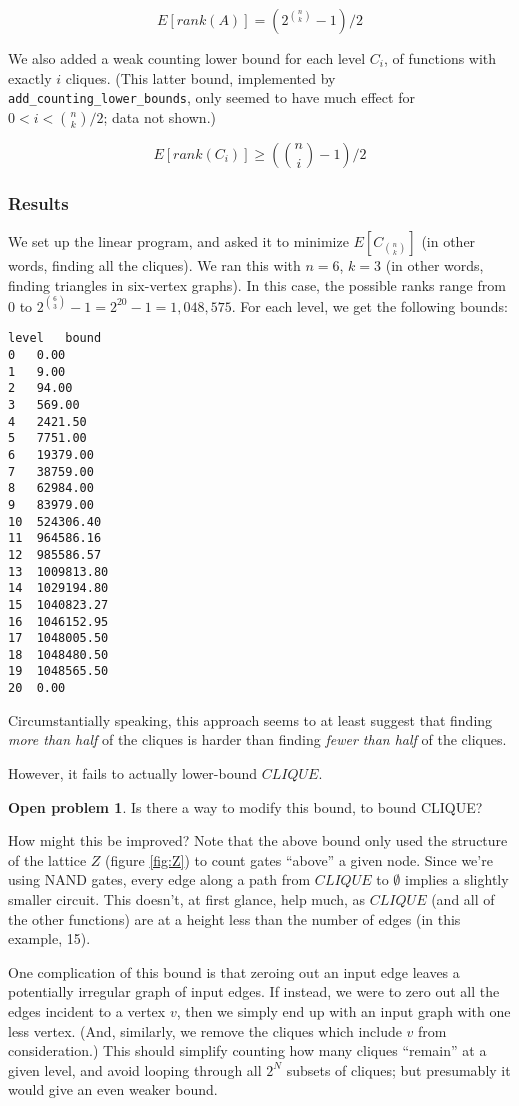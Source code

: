 \documentclass[12pt]{article}
\theoremstyle{definition}
\newtheorem{prob}{Open problem}[section]
\begin{document}
\[
E[rank(A)] = (2^{n \choose k} - 1) / 2
\]

We also added a weak counting lower bound for each level $C_i$, of functions
with exactly $i$ cliques. (This latter bound, implemented by
{\tt add\_counting\_lower\_bounds}, only seemed to have much
effect for $0 < i < {n \choose k}/2$; data not shown.)

\[
E[rank(C_i)] \ge ({n \choose i} - 1) / 2
\]

\subsubsection{Results}

We set up the linear program, and asked it to minimize $E[C_{n \choose k}]$
(in other words, finding all the cliques). We ran this with $n=6$, $k=3$
(in other words, finding triangles in six-vertex graphs). In this case,
the possible ranks range from $0$ to $2^{6 \choose 3}-1 = 2^{20}-1 = 1,048,575$.
For each level, we get the following bounds:

\begin{verbatim}
level	bound
0	0.00
1	9.00
2	94.00
3	569.00
4	2421.50
5	7751.00
6	19379.00
7	38759.00
8	62984.00
9	83979.00
10	524306.40
11	964586.16
12	985586.57
13	1009813.80
14	1029194.80
15	1040823.27
16	1046152.95
17	1048005.50
18	1048480.50
19	1048565.50
20	0.00
\end{verbatim}

Circumstantially speaking, this approach seems to at least suggest
that finding {\em more than half} of the cliques is harder than finding
{\em fewer than half} of the cliques.

However, it fails to actually lower-bound $CLIQUE$.

\begin{prob}
\label{lpRepair}
Is there a way to modify this bound, to bound CLIQUE?
\end{prob}

How might this be improved?
Note that the above bound only used the structure of the lattice $Z$ 
(figure \ref{fig:Z}) to count gates ``above'' a given node.
Since we're using NAND gates, every edge along a path from $CLIQUE$ to $\emptyset$
implies a slightly smaller circuit. This doesn't, at first glance, help much, as
$CLIQUE$ (and all of the other functions) are at a height less than the number of edges
(in this example, 15).

One complication of this bound is that zeroing out an input edge leaves a potentially
irregular graph of input edges. If instead, we were to zero out all the edges incident to a
vertex $v$, then we simply end up with an input graph with one less vertex.
(And, similarly, we remove the cliques which include $v$ from consideration.)
This should simplify counting how many cliques ``remain'' at a given level, and avoid
looping through all $2^N$ subsets of cliques; but
presumably it would give an even weaker bound.
\end{document}
